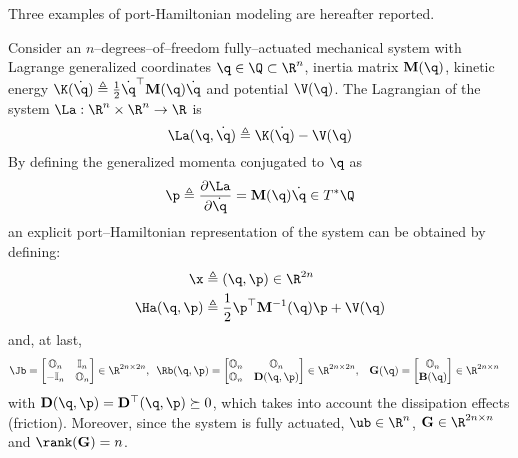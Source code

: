 %
Three examples of port-Hamiltonian modeling are hereafter reported.  
%
\begin{exmp}\label{ex:ndof}
	Consider an $n$--degrees--of--freedom fully--actuated mechanical system with Lagrange generalized coordinates $\q\in\Q\subset\R^n$, inertia matrix $\mathbf{M}(\q)$, kinetic energy $\K(\dot{\q})\triangleq\frac{1}{2}\dot{\q}^\top \mathbf{M}(\q)\dot{\q}$ and potential $\V(\q)$. The Lagrangian of the system $\La:\R^n\times\R^n\rightarrow\R$ is
    \begin{equation}
        \La(\q,\dot{\q}) \triangleq  \K(\dot{\q}) - \V(\q)
    \end{equation}
    By defining the generalized momenta conjugated to $\q$ as
    \begin{equation}
        \p \triangleq \frac{\partial \La}{\partial \dot{\q}} = \mathbf{M}(\q)\dot{\q}\in T^*\Q    
    \end{equation}
    an explicit port--Hamiltonian representation of the system can be obtained by defining:
	\begin{align}
	    \x &\triangleq (\q,\p)\in\R^{2n}\\
	    \Ha(\q,\p) &\triangleq\frac{1}{2}\p^\top\mathbf{M}^{-1}(\q)\p + \V(\q)
	\end{align}
	and, at last,
	\begin{align*}
	    \Jb = \begin{bmatrix}
	        \mathbb{O}_n&\mathbb{I}_n\\
	        -\mathbb{I}_n&\mathbb{O}_n
	    \end{bmatrix}\in\R^{2n\times 2n},~~ &
	    \Rb(\q,\p) = \begin{bmatrix}
	        \mathbb{O}_n&\mathbb{O}_n\\\mathbb{O}_n&\mathbf{D}(\q,\p)
	    \end{bmatrix}\in\R^{2n\times 2n}, &
	    \mathbf{G}(\q)=\begin{bmatrix}
	        \mathbb{O}_{n}\\\mathbf{B}(\q)
	    \end{bmatrix}\in\R^{2n\times n} &
	\end{align*}
	with $\mathbf{D}(\q,\p) = \mathbf{D}^\top(\q,\p)\succeq 0$, which takes into account the dissipation effects (friction). Moreover, since the system is fully actuated, $\ub\in\R^n$, $\mathbf{G}\in\R^{2n\times n}$ and $\rank(\mathbf{G}) = n$.
	

\end{exmp}
